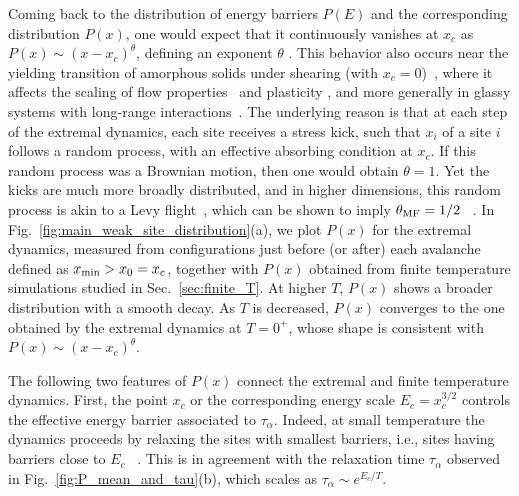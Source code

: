 \documentclass[pre,twocolumn,superscriptaddress,tightenlines,showpacs,longbibliography,floatfix,footinbib]{revtex4-1}
\newcommand{\MO}[1]{{\bf \color{red} $^{MO}$ #1}}
\begin{document}
Coming back to the distribution of energy barriers $P(E)$ and the corresponding distribution $P(x)$, %
one would expect that it continuously vanishes at $x_c$ as $P(x) \sim (x-x_c)^\theta$, defining an exponent $\theta$ \cite{popovic2021thermally}.
This behavior also occurs near the yielding transition of amorphous solids under shearing (with $x_c=0$)~\cite{Lin14a}, where it affects the scaling of flow properties~\cite{Lin2014b} and plasticity \cite{Karmakar2010}, and more generally in glassy systems with long-range interactions~\cite{muller2015marginal}. The underlying reason is that at each step of the extremal dynamics, each site receives a stress kick, such that $x_i$ of a site $i$ follows a random process, with an effective absorbing condition at $x_c$. If this random process was a Brownian motion, then one would obtain $\theta=1$. Yet the kicks are much more broadly distributed, and in higher dimensions, this random process is akin to a Levy flight~\cite{Lemaitre07}, which can be shown to imply $\theta_{\rm MF}=1/2$ ~\cite{lin2016mean}. %
In Fig.~\ref{fig:main_weak_site_distribution}(a), we plot $P(x)$ for the extremal dynamics, measured from configurations just before (or after) each avalanche defined as $x_{\rm min}>x_0=x_c$, together with $P(x)$ obtained from finite temperature simulations studied in Sec.~\ref{sec:finite_T}. 
At higher $T$, $P(x)$ shows a broader distribution with a smooth decay. As $T$ is decreased, $P(x)$ converges to the one obtained by the extremal dynamics at $T=0^+$, whose shape is consistent with $P(x)\sim (x-x_c)^\theta$.

The following two features of $P(x)$ connect the extremal and finite temperature dynamics. First, the point $x_c$ or the corresponding energy scale $E_c=x_c^{3/2}$ controls the effective energy barrier associated to $\tau_\alpha$. Indeed, at small temperature the dynamics proceeds by relaxing the sites with smallest barriers, i.e., sites having barriers close to $E_c$ ~\cite{ozawa2023elasticity,popovic2021thermally}. This is in agreement with the relaxation time $\tau_\alpha$ observed in Fig.~\ref{fig:P_mean_and_tau}(b), which scales as $ \tau_\alpha \sim e^{E_c/T}$.
\end{document}
